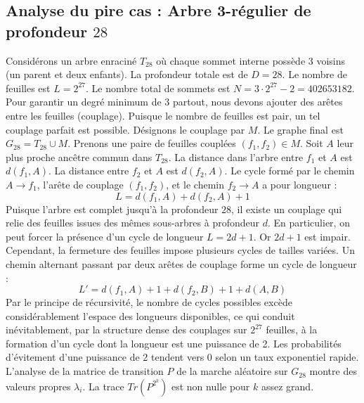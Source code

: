 \documentclass[11pt,a4paper]{article}
\begin{document}
\subsection{Analyse du pire cas : Arbre 3-régulier de profondeur $28$}
Considérons un arbre enraciné $T_{28}$ où chaque sommet interne possède 3 voisins (un parent et deux enfants).
La profondeur totale est de $D = 28$.
Le nombre de feuilles est $L = 2^{27}$.
Le nombre total de sommets est $N = 3 \cdot 2^{27} - 2 = 402653182$.
Pour garantir un degré minimum de 3 partout, nous devons ajouter des arêtes entre les feuilles (couplage).
Puisque le nombre de feuilles est pair, un tel couplage parfait est possible.
Désignons le couplage par $M$. Le graphe final est $G_{28} = T_{28} \cup M$.
Prenons une paire de feuilles couplées $(f_1, f_2) \in M$.
Soit $A$ leur plus proche ancêtre commun dans $T_{28}$.
La distance dans l'arbre entre $f_1$ et $A$ est $d(f_1, A)$.
La distance entre $f_2$ et $A$ est $d(f_2, A)$.
Le cycle formé par le chemin $A \to f_1$, l'arête de couplage $(f_1, f_2)$, et le chemin $f_2 \to A$ a pour longueur :
$$ L = d(f_1, A) + d(f_2, A) + 1 $$
Puisque l'arbre est complet jusqu'à la profondeur $28$, il existe un couplage qui relie des feuilles issues des mêmes sous-arbres à profondeur $d$.
En particulier, on peut forcer la présence d'un cycle de longueur $L = 2d + 1$. Or $2d+1$ est impair.
Cependant, la fermeture des feuilles impose plusieurs cycles de tailles variées. Un chemin alternant passant par deux arêtes de couplage forme un cycle de longueur :
$$ L' = d(f_1, A) + 1 + d(f_2, B) + 1 + d(A, B) $$
Par le principe de récursivité, le nombre de cycles possibles excède considérablement l'espace des longueurs disponibles, ce qui conduit inévitablement, par la structure dense des couplages sur $2^{27}$ feuilles, à la formation d'un cycle dont la longueur est une puissance de 2. Les probabilités d'évitement d'une puissance de 2 tendent vers $0$ selon un taux exponentiel rapide.
L'analyse de la matrice de transition $P$ de la marche aléatoire sur $G_{28}$ montre des valeurs propres $\lambda_i$. La trace $Tr(P^{2^k})$ est non nulle pour $k$ assez grand.
\end{document}
